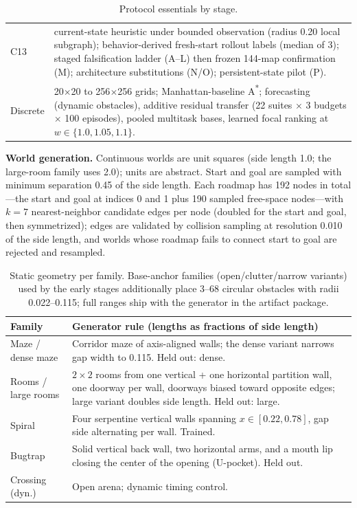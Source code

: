 \documentclass[letterpaper]{article} %
\newcommand{\stage}[1]{\textsc{#1}}
\begin{document}
\begin{table}[t]
\begin{tabular}{@{}lp{14.2cm}@{}}
\stage{C13} & current-state heuristic under bounded observation (radius 0.20 local subgraph); behavior-derived fresh-start rollout labels (median of 3); staged falsification ladder (\stage{A}--\stage{L}) then frozen 144-map confirmation (\stage{M}); architecture substitutions (\stage{N}/\stage{O}); persistent-state pilot (\stage{P}). \\
Discrete & 20$\times$20 to 256$\times$256 grids; Manhattan-baseline A\textsuperscript{*}; forecasting (dynamic obstacles), additive residual transfer (22 suites $\times$ 3 budgets $\times$ 100 episodes), pooled multitask bases, learned focal ranking at $w\in\{1.0,1.05,1.1\}$. \\
\bottomrule
\end{tabular}
\caption{Protocol essentials by stage.}
\label{tab:protocols}
\end{table}

\textbf{World generation.} Continuous worlds are unit squares (side length 1.0; the large-room family uses 2.0); units are abstract. Start and goal are sampled with minimum separation 0.45 of the side length. Each roadmap has 192 nodes in total---the start and goal at indices 0 and 1 plus 190 sampled free-space nodes---with $k{=}7$ nearest-neighbor candidate edges per node (doubled for the start and goal, then symmetrized); edges are validated by collision sampling at resolution 0.010 of the side length, and worlds whose roadmap fails to connect start to goal are rejected and resampled.

\begin{table}[t]
\centering
\small
\setlength{\tabcolsep}{2.5pt}
\begin{tabular}{@{}lp{5.6cm}@{}}
\toprule
Family & Generator rule (lengths as fractions of side length) \\
\midrule
Maze / dense maze & Corridor maze of axis-aligned walls; the dense variant narrows gap width to 0.115. Held out: dense. \\
Rooms / large rooms & $2{\times}2$ rooms from one vertical + one horizontal partition wall, one doorway per wall, doorways biased toward opposite edges; large variant doubles side length. Held out: large. \\
Spiral & Four serpentine vertical walls spanning $x \in [0.22, 0.78]$, gap side alternating per wall. Trained. \\
Bugtrap & Solid vertical back wall, two horizontal arms, and a mouth lip closing the center of the opening (U-pocket). Held out. \\
Crossing (dyn.) & Open arena; dynamic timing control. \\
\bottomrule
\end{tabular}
\caption{Static geometry per family. Base-anchor families (open/clutter/narrow variants) used by the early stages additionally place 3--68 circular obstacles with radii 0.022--0.115; full ranges ship with the generator in the artifact package.}
\label{tab:envspec}
\end{table}
\end{document}
